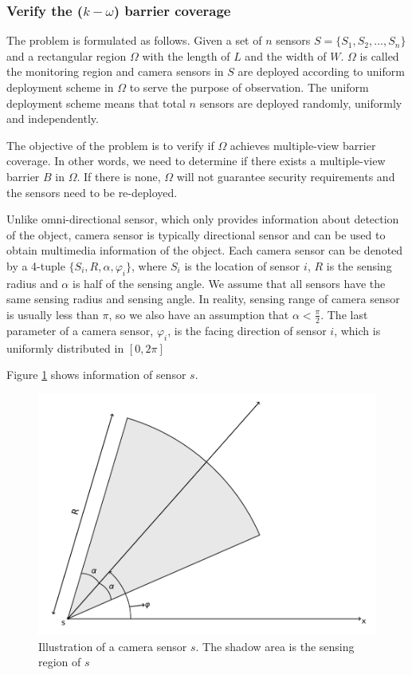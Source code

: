 \subsubsection{Verify the ($k-\omega$) barrier coverage}
The problem is formulated as follows. Given a set of $n$ sensors $S=\{S_1,S_2,...,S_n\}$ and a rectangular region $\Omega$ with the length of $L$ and the width of $W$. $\Omega$ is called the monitoring region and camera sensors in $S$ are deployed according to uniform deployment scheme in $\Omega$ to serve the purpose of observation. The uniform deployment scheme means that total $ n $ sensors are deployed randomly, uniformly and independently.\par

The objective of the problem is to verify if $\Omega$ achieves multiple-view barrier coverage. In other words, we need to determine if there exists a multiple-view barrier $B$ in $\Omega$. If there is none, $\Omega$ will not guarantee security requirements and the sensors need to be re-deployed.\par

Unlike omni-directional sensor, which only provides information about detection of the object, camera sensor is typically directional sensor and can be used to obtain multimedia information of the object. Each camera sensor can be denoted by a 4-tuple $\{S_i, R, \alpha, \varphi_i\}$, where $S_i$ is the location of sensor $i$, $R$ is the sensing radius and $\alpha$ is half of the sensing angle. We assume that all sensors have the same sensing radius and sensing angle. In reality, sensing range of camera sensor is usually less than $\pi$, so we also have an assumption that $\alpha < \displaystyle\frac{\pi}{2}$. The last parameter of a camera sensor, $\varphi_i$, is the facing direction of sensor $i$, which is uniformly distributed in $[0,2\pi]$ \par
Figure \ref{sensing-model} shows information of sensor $s$.
\begin{figure}[h]
	\centering
	\includegraphics[scale=.7]{Hinhanh/sensing-model}
	\caption{Illustration of a camera sensor $s$. The shadow area is the sensing region of $s$}
	\label{sensing-model}
\end{figure}


